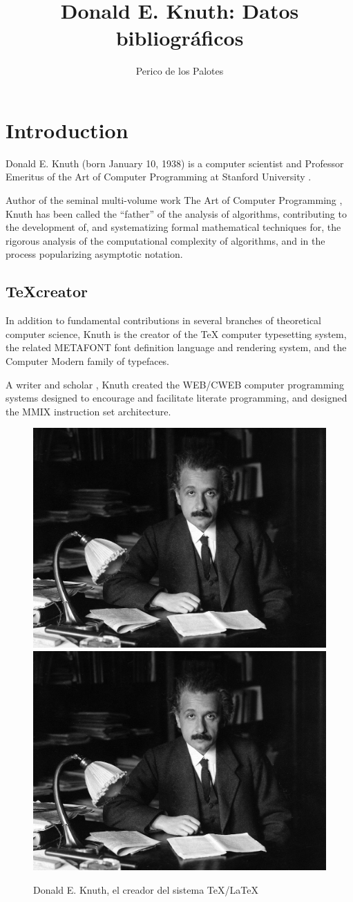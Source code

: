 \documentclass[a4paper,11pt]{article}
\title{Donald E. Knuth: Datos bibliográficos}
\author{Perico de los Palotes}
\begin{document}
\maketitle

\tableofcontents

\section{Introduction}
Donald E. Knuth (born January 10, 1938) is a computer scientist 
and Professor Emeritus of the Art of Computer Programming at 
Stanford University \cite{unistan}.

Author of the seminal multi-volume work The Art of Computer Programming \cite{acp}, 
Knuth has been called the ``father'' of the analysis of algorithms, 
contributing to the development of, and systematizing formal mathematical 
techniques for, the rigorous analysis of the computational complexity of 
algorithms, and in the process popularizing asymptotic notation.

\subsection{\TeX creator}

In addition to fundamental contributions in several branches of theoretical 
computer science, Knuth is the creator of the TeX computer typesetting 
system, the related METAFONT font definition language and rendering system, 
and the Computer Modern family of typefaces.

A writer and scholar \cite{joke}, Knuth created the WEB/CWEB computer programming 
systems designed to encourage and facilitate literate programming, 
and designed the MMIX instruction set architecture.

\begin{figure}[h]
\begin{center} 
\bigskip
\includegraphics[trim=15 30 30 0,clip,height=0.3\textwidth]{Images/einstein.jpg} \hspace{5mm}
\includegraphics[origin=c,angle=180,height=0.3\textwidth]{Images/einstein.jpg}
\end{center}
\vspace{-5mm}
\caption{Donald E. Knuth, el creador del sistema TeX/LaTeX}
\end{figure}
\end{document}
